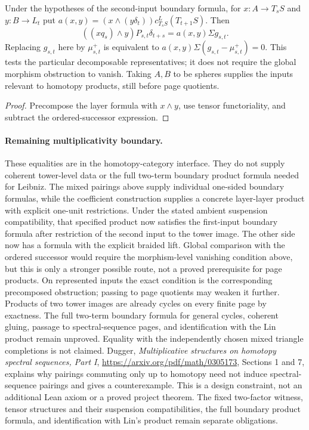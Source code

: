 \begin{proposition}
  \label{prop:h6-right-boundary-representatives}
  \leanok
  Under the hypotheses of the second-input boundary formula, for
  $x:A\to T_sS$ and $y:B\to L_t$ put
  $a(x,y)=(x\wedge(y\delta_t))c^L_{T_sS}(T_{t+1}S)$. Then
  \[
    ((xq_s)\wedge y)P_{s,t}\delta_{t+s}=a(x,y)\Sigma g_{s,t}.
  \]
  Replacing $g_{s,t}$ here by $\mu^+_{s,t}$ is equivalent to
  $a(x,y)\Sigma(g_{s,t}-\mu^+_{s,t})=0$. This tests the particular
  decomposable representatives; it does not require the global morphism
  obstruction to vanish. Taking $A,B$ to be spheres supplies the inputs
  relevant to homotopy products, still before page quotients.
\end{proposition}
\begin{proof}
  Precompose the layer formula with $x\wedge y$, use tensor functoriality,
  and subtract the ordered-successor expression.
  \leanok
\end{proof}

\paragraph{Remaining multiplicativity boundary.}
These equalities are in the homotopy-category interface. They do not supply
coherent tower-level data or the full two-term boundary product formula
needed for Leibniz. The mixed pairings above supply individual one-sided
boundary formulas, while the coefficient construction supplies a concrete
layer-layer product with explicit one-unit restrictions. Under the stated
ambient suspension compatibility, that specified product now satisfies
the first-input boundary formula after restriction of the second input to
the tower image. The other side now has a formula with the explicit braided
lift. Global comparison with the ordered successor would require the
morphism-level vanishing condition above, but this is only a stronger
possible route, not a proved prerequisite for page products. On represented
inputs the exact condition is the corresponding precomposed obstruction;
passing to page quotients may weaken it further. Products of two tower
images are already cycles on every finite page by exactness. The full
two-term boundary formula for general cycles, coherent
gluing, passage to spectral-sequence pages, and identification with the
Lin product remain unproved. Equality
with the independently chosen mixed triangle completions is not claimed.
Dugger, \emph{Multiplicative structures on homotopy spectral sequences, Part I},
\url{https://arxiv.org/pdf/math/0305173}, Sections 1 and 7, explains why pairings
commuting only up to homotopy need not induce spectral-sequence pairings and
gives a counterexample. This is a design constraint, not an additional Lean
axiom or a proved project theorem. The fixed two-factor witness, tensor
structures and their suspension compatibilities, the full boundary product
formula, and identification with Lin's product remain separate obligations.

